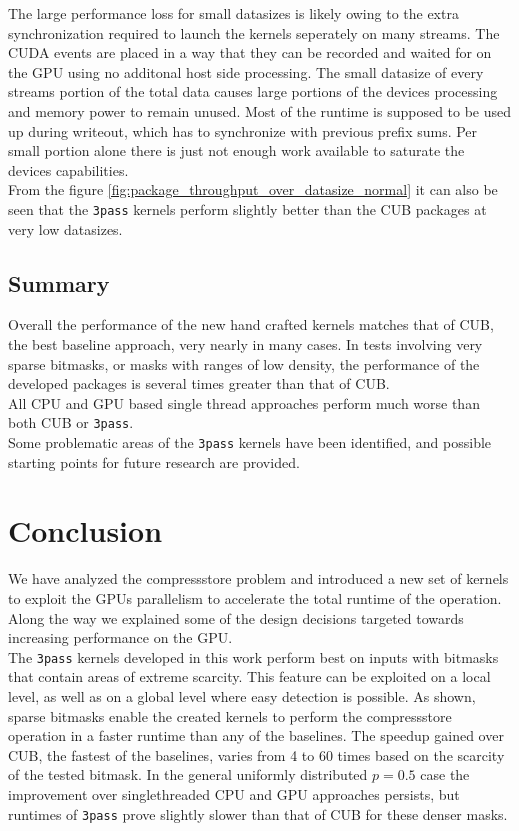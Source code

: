 \documentclass{tudscrreprt}
\begin{document}
			The large performance loss for small datasizes is likely owing to the extra synchronization required to launch the kernels seperately on many streams. The CUDA events are placed in a way that they can be recorded and waited for on the GPU using no additonal host side processing. The small datasize of every streams portion of the total data causes large portions of the devices processing and memory power to remain unused. Most of the runtime is supposed to be used up during writeout, which has to synchronize with previous prefix sums. Per small portion alone there is just not enough work available to saturate the devices capabilities. \\
			
			From the figure \ref{fig:package_throughput_over_datasize_normal} it can also be seen that the \texttt{3pass} kernels perform slightly better than the CUB packages at very low datasizes. \\
		
		\section{Summary}
			Overall the performance of the new hand crafted kernels matches that of CUB, the best baseline approach, very nearly in many cases. In tests involving very sparse bitmasks, or masks with ranges of low density, the performance of the developed packages is several times greater than that of CUB. \\
			All CPU and GPU based single thread approaches perform much worse than both CUB or \texttt{3pass}. \\
			
			Some problematic areas of the \texttt{3pass} kernels have been identified, and possible starting points for future research are provided. \\
		
	\chapter{Conclusion}
		We have analyzed the compressstore problem and introduced a new set of kernels to exploit the GPUs parallelism to accelerate the total runtime of the operation. Along the way we explained some of the design decisions targeted towards increasing performance on the GPU. \\
		The \texttt{3pass} kernels developed in this work perform best on inputs with bitmasks that contain areas of extreme scarcity. This feature can be exploited on a local level, as well as on a global level where easy detection is possible. As shown, sparse bitmasks enable the created kernels to perform the compressstore operation in a faster runtime than any of the baselines. The speedup gained over CUB, the fastest of the baselines, varies from 4 to 60 times based on the scarcity of the tested bitmask. In the general uniformly distributed $p=0.5$ case the improvement over singlethreaded CPU and GPU approaches persists, but runtimes of \texttt{3pass} prove slightly slower than that of CUB for these denser masks. \\
		
\end{document}
